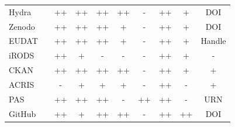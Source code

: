 \begin{table}
{\begin{tabular}{| l | c | c | c | c | c | c | c | c | c |}
            \cellcolor{first-column-blue}Hydra    && \cellcolor{green}++ & \cellcolor{green}++ & \cellcolor{green}++ & \cellcolor{green}++ & \cellcolor{red}-  &  \cellcolor{green}++ & \cellcolor{yellow}+  & \cellcolor{green}DOI \\
            \cline{3-10}\cline{1-1}
            \cellcolor{first-column-blue}Zenodo   && \cellcolor{green}++ & \cellcolor{green}++ & \cellcolor{green}++ & \cellcolor{yellow}+  & \cellcolor{red}-  &  \cellcolor{green}++ & \cellcolor{yellow}+  & \cellcolor{green}DOI \\
            \cline{3-10}\cline{1-1}
            \cellcolor{first-column-blue}EUDAT    && \cellcolor{green}++ & \cellcolor{green}++ & \cellcolor{green}++ & \cellcolor{yellow}+  & \cellcolor{red}-  &  \cellcolor{green}++ & \cellcolor{yellow}+  & \cellcolor{green}Handle \\
            \cline{3-10}\cline{1-1}
            \cellcolor{first-column-blue}iRODS    && \cellcolor{green}++ & \cellcolor{yellow}+ & \cellcolor{red}-  & \cellcolor{red}-  & \cellcolor{red}-  &  \cellcolor{green}++ & \cellcolor{yellow}+  & \cellcolor{red}- \\
            \cline{3-10}\cline{1-1}
            \cellcolor{first-column-blue}CKAN     && \cellcolor{green}++ & \cellcolor{green}++ & \cellcolor{green}++ & \cellcolor{green}++ & \cellcolor{red}-  &  \cellcolor{green}++ & \cellcolor{yellow}+  & \cellcolor{yellow}+ \\
            \cline{3-10}\cline{1-1}
            \cellcolor{first-column-blue}ACRIS    && \cellcolor{red}-  & \cellcolor{yellow}+  & \cellcolor{yellow}+  & \cellcolor{yellow}+  & \cellcolor{red}-  &  \cellcolor{green}++ & \cellcolor{red}-  & \cellcolor{yellow}+ \\
            \cline{3-10}\cline{1-1}
            \cellcolor{first-column-blue}PAS      && \cellcolor{green}++ & \cellcolor{green}++ & \cellcolor{green}++ & \cellcolor{red}-  & \cellcolor{green}++ &  \cellcolor{green}++ & \cellcolor{red}-  & \cellcolor{green}URN \\
            \cline{3-10}\cline{1-1}
            \cellcolor{first-column-blue}GitHub   && \cellcolor{green}++ & \cellcolor{yellow}+  & \cellcolor{green}++ & \cellcolor{green}++ & \cellcolor{red}-  &  \cellcolor{green}++ & \cellcolor{green}++ & \cellcolor{green}DOI \\
            \cline{3-10}\cline{1-1}
        \end{tabular}
    }
\end{table}

